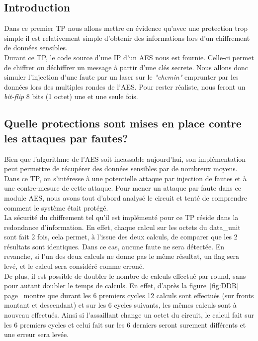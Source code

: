 \subsection{Introduction}
Dans ce premier TP nous allons mettre en évidence qu'avec une protection trop simple 
il est relativement simple d'obtenir des informations lors d'un chiffrement de données 
sensibles.\\

Durant ce TP, le code source d'une IP d'un AES nous est fournie. 
Celle-ci permet de chiffrer ou déchiffrer un message à partir d'une clés secrete. 
Nous allons donc simuler l'injection d'une faute par un laser sur le {\em "chemin"} 
emprunter par les données lors des multiples rondes de l'AES. Pour rester 
réaliste, nous feront un {\em bit-flip} 8 bits (1 octet) une et une seule fois.

\subsection{Quelle protections sont mises en place contre les attaques par fautes?}

Bien que l'algorithme de l'AES soit incassable aujourd'hui, son implémentation
peut permettre de récupérer des données sensibles par de nombreux moyens.
Dans ce TP, on s'intéresse à une potentielle attaque par injection de fautes et
à une contre-mesure de cette attaque.
Pour mener un attaque par faute  dans ce module AES, nous avons tout d'abord
analysé le circuit et tenté de comprendre comment le système était protégé.\\

La sécurité du chiffrement tel qu'il est implémenté pour ce TP réside dans la
redondance d'information.
En effet, chaque calcul sur les octets du data\_unit sont fait 2 fois, cela
permet, à l'issue des deux calculs, de comparer que les 2 résultats sont
identiques.
Dans ce cas, aucune faute ne sera détectée. En revanche, si l'un des deux
calculs ne donne pas le même résultat, un flag sera levé, et le calcul sera
considéré comme erroné.\\

De plus, il est possible de doubler le nombre de calculs effectué par round,
sans pour autant doubler le temps de calculs.
En effet, d'après la figure~\ref{fig:DDR} page~\pageref{fig:DDR} montre que
durant les 6 premiers cycles 12 calculs sont effectués (sur fronts montant et
descendant) et sur les 6 cycles suivants, 
les mêmes calculs sont à nouveau effectués.
Ainsi si l'assaillant change un octet du circuit, le calcul fait sur les 6
premiers cycles et celui fait sur les 6 derniers seront surement différents et
une erreur sera levée.

